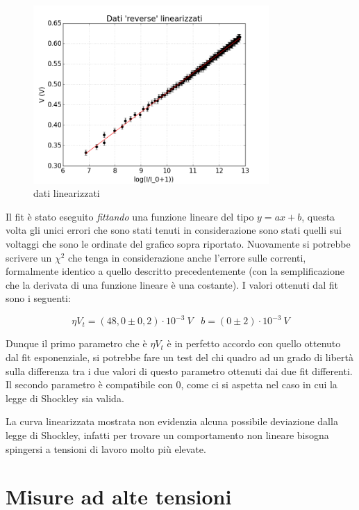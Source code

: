 \documentclass[a4paper,10pt]{article}
\begin{document}
\begin{figure}[!htb]
\begin{center}
\includegraphics[width=0.8\textwidth]{lin2.png}
\end{center}
\caption{dati linearizzati}
\end{figure}


Il fit è stato eseguito \emph{fittando} una funzione lineare del tipo $y = ax+b$, questa volta gli unici errori che sono stati tenuti in considerazione sono stati quelli sui voltaggi che sono le ordinate del grafico sopra riportato. Nuovamente si potrebbe scrivere un $\chi^2$ che tenga in considerazione anche l'errore sulle correnti, formalmente identico a quello descritto precedentemente (con la semplificazione che la derivata di una funzione lineare è una costante).
I valori ottenuti dal fit sono i seguenti:

\begin{equation}
\eta V_t = (48,0 \pm 0,2) \cdot 10^{-3}\:V\;\;\;b =(0 \pm 2) \cdot 10^{-3}\:V
\end{equation}

Dunque il primo parametro che è $\eta V_t$ è in perfetto accordo con quello ottenuto dal fit esponenziale, si potrebbe fare un test del chi quadro ad un grado di libertà sulla differenza tra i due valori di questo parametro ottenuti dai due fit differenti. Il secondo parametro è compatibile con 0, come ci si aspetta nel caso in cui la legge di Shockley sia valida. 

La curva linearizzata mostrata non evidenzia alcuna possibile deviazione dalla legge di Shockley, infatti per trovare un comportamento non lineare bisogna spingersi a tensioni di lavoro molto più elevate.

\section{Misure ad alte tensioni}
\end{document}
